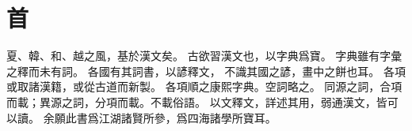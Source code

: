 \chapter*{首}
夏、韓、和、越之風，基於漢文矣。
古欲習漢文也，以字典爲寶。
字典雖有字彙之釋而未有詞。
各國有其詞書，以諺釋文，
不識其國之諺，畫中之餅也耳。
各項或取諸漢籍，或從古道而新製。
各項順之康熙字典。空詞略之。
同源之詞，合項而載；異源之詞，分項而載。不載俗語。
以文釋文，詳述其用，弱通漢文，皆可以讀。
余願此書爲江湖諸賢所參，爲四海諸學所寶耳。
